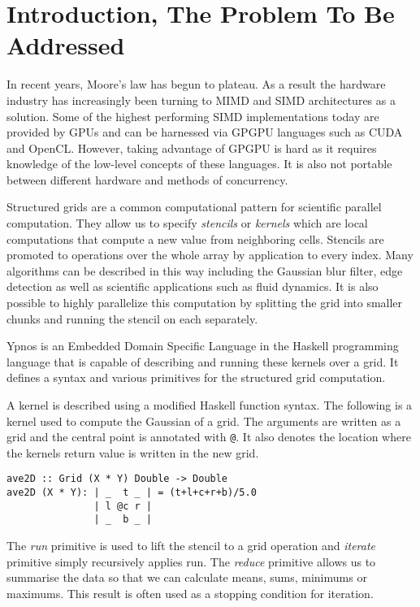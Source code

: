 



\section*{Introduction, The Problem To Be Addressed}

In recent years, Moore's law has begun to plateau. As a result the hardware 
industry has increasingly been turning to MIMD and SIMD architectures as a 
solution.  Some of the highest performing SIMD implementations today are 
provided by GPUs and can be harnessed via GPGPU languages such as CUDA and 
OpenCL.  However, taking advantage of GPGPU is hard as it requires knowledge of 
the low-level concepts of these languages. It is also not portable between 
different hardware and methods of concurrency.

Structured grids are a common computational pattern for scientific parallel 
computation. They allow us to specify \emph{stencils} or \emph{kernels} which 
are local computations that compute a new value from neighboring cells.  
Stencils are promoted to operations over the whole array by application to 
every index.  Many algorithms can be described in this way including the 
Gaussian blur filter, edge detection as well as scientific applications such as 
fluid dynamics. It is also possible to highly parallelize this computation by 
splitting the grid into smaller chunks and running the stencil on each 
separately.

Ypnos is an Embedded Domain Specific Language in the Haskell programming 
language that is capable of describing and running these kernels over a grid.  
It defines a syntax and various primitives for the structured grid computation.  

A kernel is described using a modified Haskell function syntax. The following 
is a kernel used to compute the Gaussian of a grid. The arguments are written 
as a grid and the central point is annotated with \verb|@|. It also denotes the 
location where the kernels return value is written in the new grid.

\begin{verbatim}
ave2D :: Grid (X * Y) Double -> Double
ave2D (X * Y): | _  t _ | = (t+l+c+r+b)/5.0
               | l @c r |
               | _  b _ |
\end{verbatim}

The \emph{run} primitive is used to lift the stencil to a grid operation and 
\emph{iterate} primitive simply recursively applies run. The \emph{reduce} 
primitive allows us to summarise the data so that we can calculate means, sums, 
minimums or maximums. This result is often used as a stopping condition for 
iteration.

